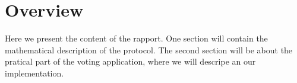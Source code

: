\section{Overview}
Here we present the content of the rapport. One section will contain the mathematical description of the protocol. The second section will be about the pratical part of the voting application, where we will descripe an our implementation.